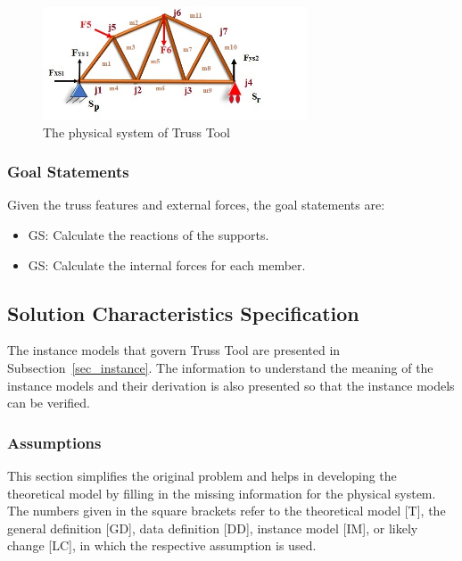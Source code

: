 \documentclass[12pt]{article}
\newcounter{goalnum} %
\begin{document}
 \begin{figure}[h!]
\begin{center}
 
  \includegraphics[width=0.7\textwidth]{physic_system.jpg}
 
 \caption{The physical system of Truss Tool}
 \label{fig_physys}
 \end{center}
 \end{figure}

\subsubsection{Goal Statements} \label{Sec_gs}

\noindent Given the truss features and external forces, the goal statements are:

\begin{itemize}
\item{GS\thegoalnum \label{G_react}: Calculate the reactions of the supports.}
\item{GS\thegoalnum \label{G_force}: Calculate the internal forces for each member.}
\end{itemize}

\subsection{Solution Characteristics Specification}
The instance models that govern Truss Tool are presented in
Subsection~\ref{sec_instance}.  The information to understand the meaning of the instance models and their derivation is also presented so that the instance models can be verified.

\subsubsection{Assumptions} \label{sec_assumpt}

This section simplifies the original problem and helps in developing the
theoretical model by filling in the missing information for the physical
system. The numbers given in the square brackets refer to the theoretical model
[T], the general definition [GD], data definition [DD], instance model [IM], or
likely change [LC], in which the respective assumption is used.
\end{document}
